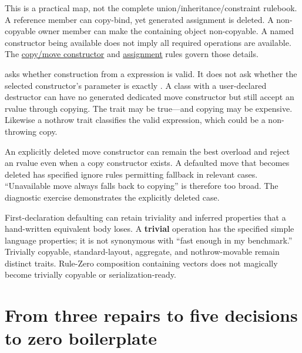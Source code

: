 This is a practical map, not the complete union/inheritance/constraint rulebook. A reference member can copy-bind, yet generated assignment is deleted. A non-copyable owner member can make the containing object non-copyable. A named constructor being available does not imply all required operations are available. The \href{https://eel.is/c++draft/class.copy.ctor}{copy/move constructor} and \href{https://eel.is/c++draft/class.copy.assign}{assignment} rules govern those details.

 asks whether construction from a  expression is valid. It does not ask whether the selected constructor's parameter is exactly . A class with a user-declared destructor can have no generated dedicated move constructor but still accept an rvalue through  copying. The trait may be true---and copying may be expensive. Likewise a nothrow trait classifies the valid expression, which could be a non-throwing copy.

An explicitly deleted move constructor can remain the best overload and reject an rvalue even when a copy constructor exists. A defaulted move that becomes deleted has specified ignore rules permitting fallback in relevant cases. ``Unavailable move always falls back to copying'' is therefore too broad. The diagnostic exercise demonstrates the explicitly deleted case.

First-declaration defaulting can retain triviality and inferred properties that a hand-written equivalent body loses. A \textbf{trivial} operation has the specified simple language properties; it is not synonymous with ``fast enough in my benchmark.'' Trivially copyable, standard-layout, aggregate, and nothrow-movable remain distinct traits. Rule-Zero composition containing vectors does not magically become trivially copyable or serialization-ready.

\section{From three repairs to five decisions to zero boilerplate}\label{01-foundations-i-ch003-from-three-repairs-to-five-decisions-to-zero-boilerplate}

\hypertarget{01-foundations-i-ch003-from-three-repairs-to-five-decisions-to-zero-boilerplate}{}


